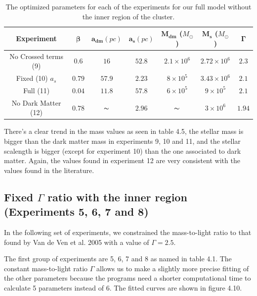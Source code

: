 \begin{table}[]
\centering
\begin{tabular}{| c| c| c| c| c| c| c|}
    \hline
    \textbf{Experiment} & $\mathbf{\beta}$ & $\mathbf{a_{dm}} (pc)$ & $\mathbf{a_{s}} (pc)$ & $\mathbf{M_{dm}}$ ($M_{\odot}$) & $\mathbf{M_{s}}$ ($M_{\odot}$) & $\mathbf{\Gamma}$\\ \hline
	No Crossed terms (9) & $0.6$ &	$16$ &	$52.8$ &	$2.1 \times 10^{6}$ &	$2.72 \times 10^{6}$ &	$2.3$\\ \hline
	Fixed (10) $a_s$ &	$0.79$ &	$57.9$ &	$2.23$ &	$8 \times 10^{5}$ &	$3.43 \times 10 ^{6}$ &	$2.1$\\ \hline
	Full (11) &	$0.04$ &	$11.8$ &	$57.8$ &	$6 \times 10^{5}$ &	$9 \times 10^{5}$ &	$2.1$\\ \hline
	No Dark Matter (12) &	$0.78$ &	$\thicksim$ & $2.96$ &	$\thicksim$ & $ 3 \times 10^{6}$ & 	$1.94$\\
    \hline
  \end{tabular} 
\caption[Optimized parameters for our full model without the inner region.]{The optimized parameters for each of the experiments for our full model without the inner region of the cluster.}
\end{table}

There's a clear trend in the mass values as seen in table 4.5, the stellar mass is bigger than the dark matter mass in experiments 9, 10 and 11, and the stellar scalength is bigger (except for experiment 10) than the one associated to dark matter. Again, the values found in experiment 12 are very consistent with the values found in the literature. 

\subsection{Fixed $\Gamma$ ratio with the inner region (Experiments 5, 6, 7 and 8)}

In the following set of experiments, we constrained the mass-to-light ratio to that found by Van de Ven et al. 2005 with a value of $\Gamma = 2.5$. 

The first group of experiments are 5, 6, 7 and 8 as named in table 4.1. The constant mass-to-light ratio $\Gamma$ allows us to make a slightly more precise fitting of the other parameters because the programs need a shorter computational time to calculate 5 parameters instead of 6. The fitted curves are shown in figure 4.10. 

